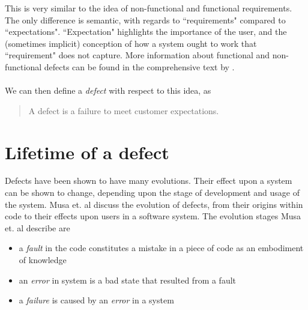 This is very similar to the idea of non-functional and functional requirements.
The only difference is semantic, with regards to ``requirements" compared to ``expectations".
``Expectation" highlights the importance of the user, and the (sometimes implicit) conception of
how a system ought to work that ``requirement" does not capture.
More information about functional and non-functional defects can be found in the comprehensive
text by \FIXME.\\
\\
We can then define a {\em defect} with respect to this idea, as
\begin{quote}
	A defect is a failure to meet customer expectations.
\end{quote}

\section{Lifetime of a defect} \label{sec:defect:lifetime}

Defects have been shown to have many evolutions.
Their effect upon a system can be shown to change, depending upon the stage of development and
usage of the system.
Musa et. al \cite{musa1987software} discuss the evolution of defects, from their origins within
code to their effects upon users in a software system.
The evolution stages Musa et. al describe are
\begin{itemize}
	\item a {\em fault} in the code constitutes a mistake in a piece of code as an embodiment of
		knowledge
	\item an {\em error} in system is a bad state that resulted from a fault
	\item a {\em failure} is caused by an {\em error} in a system
\end{itemize}

